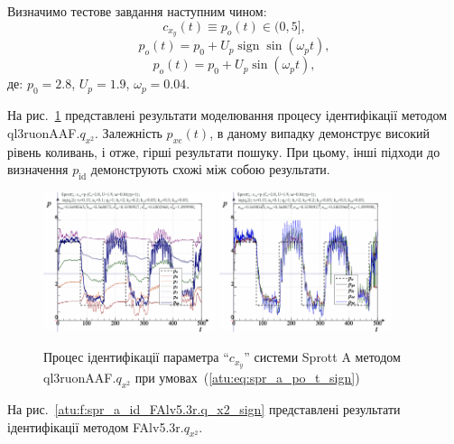 \documentclass[a4paper,13pt]{atuaref}
\DeclareMathOperator*{\sign}{sign}
\begin{document}
Визначимо тестове завдання наступним чином:
\[
  c_{x_y}(t) \equiv p_o(t) \in (0, 5],
\]
%
\begin{equation}
  p_o(t) = p_0 +  U_{p} \sign \sin( \omega_{p} t ),
  \label{atu:eq:spr_a_po_t_sign}
\end{equation}
%
%
\begin{equation}
  p_o(t) = p_0 +  U_{p} \sin( \omega_{p} t ),
  \label{atu:eq:spr_a_po_t_sin}
\end{equation}
%
де:
$p_0 = 2.8$, $U_p=1.9$, $\omega_p=0.04$.

На рис.~\ref{atu:f:spr_a_id_ql3ruonAAF.q_x2_sign}
представлені результати моделювання процесу ідентифікації методом ql3ruonAAF.$q_{x^2} $.
Залежність $ p_{xe} (t) $, в даному випадку демонструє високий
рівень коливань, і отже, гірші результати пошуку. При цьому, інші підходи до
визначення $ p_\mathrm{id} $ демонструють схожі між собою результати.

\begin{figure}[h!]
  \centerline{
    \includegraphics[width=0.45\textwidth]{p5/p/cha/spr_a/qAuv5.3r/sprott_a_qAuv5_3r_qx2-p_t_pi_sign.png}
    \hfill
    \includegraphics[width=0.45\textwidth]{p5/p/cha/spr_a/qAuv5.3r/sprott_a_qAuv5_3r_qx2-p_t_pz_sign.png}
  }
  \caption{Процес ідентифікації параметра ``$c_{x_y}$'' системи Sprott A методом ql3ruonAAF.$q_{x^2}$ при умовах~(\ref{atu:eq:spr_a_po_t_sign})}
  \label{atu:f:spr_a_id_ql3ruonAAF.q_x2_sign}
\end{figure}

На рис.~\ref{atu:f:spr_a_id_FAlv5.3r.q_x2_sign}
представлені результати ідентифікації методом
FAlv5.3r.$q_{x^2}$.
\end{document}
